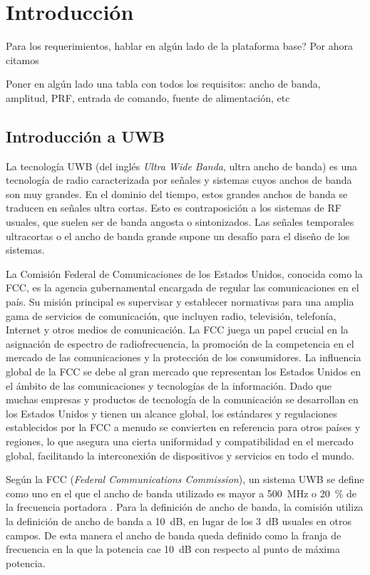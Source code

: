 \chapter{Introducción}

Para los requerimientos, hablar en algún lado de la plataforma base? Por ahora
citamos \cite{altieri2017}

Poner en algún lado una tabla con todos los requisitos: ancho de banda, amplitud, PRF, entrada de comando, fuente de alimentación, etc

\section{Introducción a UWB}

La tecnología UWB (del inglés \textit{Ultra Wide Banda}, ultra ancho de banda) es una
tecnología de radio caracterizada por señales y sistemas cuyos anchos de banda son muy
grandes. En el dominio del tiempo, estos grandes anchos de banda se traducen en
señales ultra cortas. Esto es contraposición a los sistemas de RF usuales, que
suelen ser de banda angosta o sintonizados. Las señales temporales ultracortas o
el ancho de banda grande supone un desafío para el diseño de los sistemas.

La Comisión Federal de Comunicaciones de los Estados Unidos, conocida como la
FCC, es la agencia gubernamental encargada de regular las comunicaciones en el
país. Su misión principal es supervisar y establecer normativas para una amplia
gama de servicios de comunicación, que incluyen radio, televisión, telefonía,
Internet y otros medios de comunicación. La FCC juega un papel crucial en la
asignación de espectro de radiofrecuencia, la promoción de la competencia en el
mercado de las comunicaciones y la protección de los consumidores. La influencia
global de la FCC se debe al gran mercado que representan los Estados Unidos en
el ámbito de las comunicaciones y tecnologías de la información. Dado que muchas
empresas y productos de tecnología de la comunicación se desarrollan en los
Estados Unidos y tienen un alcance global, los estándares y regulaciones
establecidos por la FCC a menudo se convierten en referencia para otros países y
regiones, lo que asegura una cierta uniformidad y compatibilidad en el mercado
global, facilitando la interconexión de dispositivos y servicios en todo el
mundo.

Según la FCC (\textit{Federal Communications Commission}), un sistema UWB se
define como uno en el que el ancho de banda utilizado es mayor a
\qty{500}{\mega\hertz} o \qty{20}{\percent} de la frecuencia portadora
\cite{FCC_UWB}. Para la definición de ancho de banda, la comisión utiliza la
definición de ancho de banda a \qty{10}{\dB}, en lugar de los \qty{3}{\dB}
usuales en otros campos. De esta manera el ancho de banda queda definido como la
franja de frecuencia en la que la potencia cae \qty{10}{\dB} con respecto al
punto de máxima potencia.

